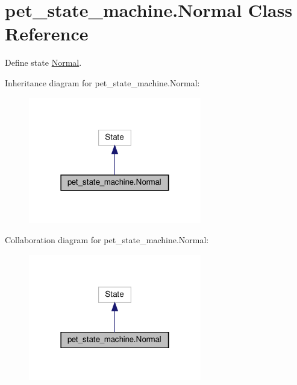 \hypertarget{classpet__state__machine_1_1Normal}{}\section{pet\+\_\+state\+\_\+machine.\+Normal Class Reference}
\label{classpet__state__machine_1_1Normal}


Define state \hyperlink{classpet__state__machine_1_1Normal}{Normal}.  




Inheritance diagram for pet\+\_\+state\+\_\+machine.\+Normal\+:
\nopagebreak
\begin{figure}[H]
\begin{center}
\leavevmode
\includegraphics[width=214pt]{classpet__state__machine_1_1Normal__inherit__graph}
\end{center}
\end{figure}


Collaboration diagram for pet\+\_\+state\+\_\+machine.\+Normal\+:
\nopagebreak
\begin{figure}[H]
\begin{center}
\leavevmode
\includegraphics[width=214pt]{classpet__state__machine_1_1Normal__coll__graph}
\end{center}
\end{figure}
